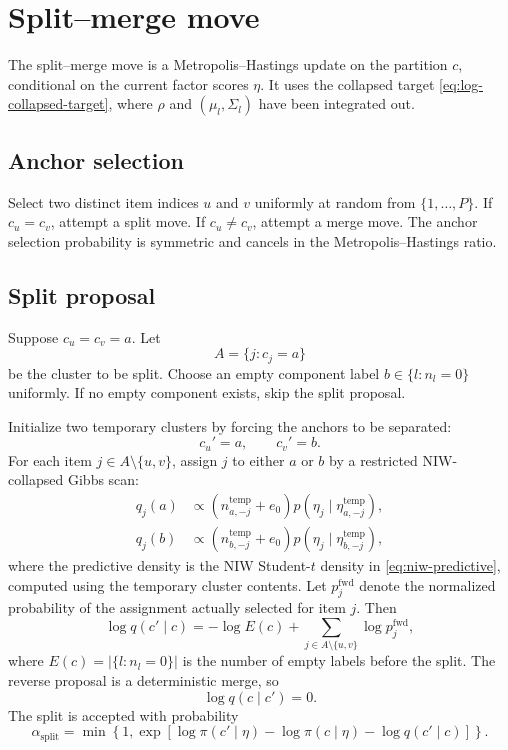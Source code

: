 \documentclass[11pt]{article}
\begin{document}
\section{Split--merge move}
\label{sec:split-merge}

The split--merge move is a Metropolis--Hastings update on the partition
$c$, conditional on the current factor scores $\eta$.  It uses the collapsed
target \eqref{eq:log-collapsed-target}, where $\rho$ and
$(\mu_l,\Sigma_l)$ have been integrated out.

\subsection{Anchor selection}

Select two distinct item indices $u$ and $v$ uniformly at random from
$\{1,\dots,P\}$.  If $c_u=c_v$, attempt a split move.  If $c_u\neq c_v$,
attempt a merge move.  The anchor selection probability is symmetric and
cancels in the Metropolis--Hastings ratio.

\subsection{Split proposal}

Suppose $c_u=c_v=a$.  Let
\[
    A=\{j:c_j=a\}
\]
be the cluster to be split.  Choose an empty component label
$b\in\{l:n_l=0\}$ uniformly.  If no empty component exists, skip the split
proposal.

Initialize two temporary clusters by forcing the anchors to be separated:
\[
    c_u'=a,
    \qquad
    c_v'=b.
\]
For each item $j\in A\setminus\{u,v\}$, assign $j$ to either $a$ or $b$ by
a restricted NIW-collapsed Gibbs scan:
\begin{align}
    q_j(a)&\propto
    (n_{a,-j}^{\mathrm{temp}}+e_0)
    p(\eta_j\mid\eta_{a,-j}^{\mathrm{temp}}),\\
    q_j(b)&\propto
    (n_{b,-j}^{\mathrm{temp}}+e_0)
    p(\eta_j\mid\eta_{b,-j}^{\mathrm{temp}}),
\end{align}
where the predictive density is the NIW Student-$t$ density in
\eqref{eq:niw-predictive}, computed using the temporary cluster contents.
Let $p_j^{\mathrm{fwd}}$ denote the normalized probability of the assignment
actually selected for item $j$.  Then
\begin{equation}
    \log q(c'\mid c)
    =
    -\log E(c)+
    \sum_{j\in A\setminus\{u,v\}}
    \log p_j^{\mathrm{fwd}},
\end{equation}
where $E(c)=|\{l:n_l=0\}|$ is the number of empty labels before the split.
The reverse proposal is a deterministic merge, so
\[
    \log q(c\mid c')=0.
\]
The split is accepted with probability
\begin{equation}
    \alpha_{\mathrm{split}}
    =
    \min\left\{1,
    \exp\left[
    \log\pi(c'\mid\eta)-\log\pi(c\mid\eta)
    -\log q(c'\mid c)
    \right]
    \right\}.
\end{equation}
\end{document}
